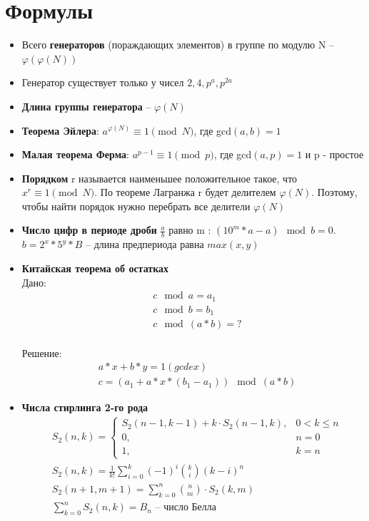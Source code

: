 \documentclass[10pt]{article}
\begin{document}
\section{Формулы}
\begin{itemize}
\item Всего \textbf{генераторов} (пораждающих элементов) в группе по модулю N -- $\varphi(\varphi(N))$
\item Генератор существует только у чисел $2, 4, p^a, p^{2a}$
\item \textbf{Длина группы генератора} -- $\varphi(N)$
\item \textbf{Теорема Эйлера}: $a^{\varphi(N)} \equiv 1 \pmod{N}$, где gcd$(a, b) = 1$
\item \textbf{Малая теорема Ферма}: $a^{p-1} \equiv 1 \pmod{p}$, где gcd$(a, p) = 1$ и p - простое
\item \textbf{Порядком} r называется наименьшее положительное такое, что $x^r \equiv 1 \pmod{N}$.
По теореме Лагранжа r будет делителем $\varphi(N)$. Поэтому, чтобы найти порядок нужно перебрать все делители $\varphi(N)$
\item \textbf{Число цифр в периоде дроби} $\frac{a}{b}$ равно m : $(10^{m}*a - a) \mod{b} = 0$. $b = 2^x*5^y*B$ -- длина предпериода равна $max(x, y)$
\item \textbf{Китайская теорема об остатках}
\\ Дано: 
\begin{equation*}
  \begin{split}
    &c\mod a = a_1 \\
    &c\mod b = b_1 \\
    &c\mod (a * b) = ?
  \end{split}
  \end{equation*}
\\ Решение:
\begin{equation*}
  \begin{split}
    &a*x + b*y = 1 (gcdex)\\
    &c = (a_1 + a * x * (b_1 - a_1)) \mod (a * b)
  \end{split}
  \end{equation*}
\item \textbf{Числа стирлинга 2-го рода}
\begin{equation}
  \begin{split}
    &S_2(n, k) = 
    \left\{
    \begin{array}{cc}
    S_2(n-1, k-1) + k \cdot S_2(n-1, k), & 0 < k \le n\\
    0, & n = 0\\
    1, & k = n
    \end{array}
    \right.\\
    &S_2(n, k) = \frac{1}{k!}\sum\limits_{i=0}^k(-1)^{i}\binom{k}{i}(k - i)^n\\
    &S_2(n + 1, m + 1) = \sum\limits_{k=0}^n\binom{n}{m} \cdot S_2(k, m)\\
    &\sum\limits_{k=0}^nS_2(n, k) = B_n \text{ -- число Белла}
  \end{split}
\end{equation}
\begin{longtable}[c]{lllllllllll}


\end{longtable}
\end{itemize}
\end{document}
